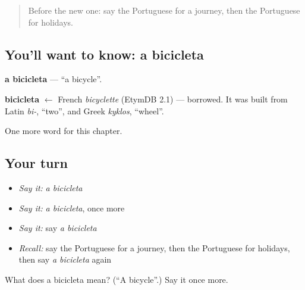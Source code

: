 \label{lesson:PT-C91-bicicleta}



\begin{quote}
Before the new one: say the Portuguese for a journey, then the Portuguese for holidays.
\end{quote}

\subsection*{You'll want to know: a bicicleta}
\textbf{a bicicleta} — \textquotedblleft{}a bicycle\textquotedblright{}.

\begin{cousinweb}
\textbf{bicicleta} $\leftarrow$ French \emph{bicyclette} (EtymDB 2.1) — borrowed. It was built from Latin \emph{bi-}, \textquotedblleft{}two\textquotedblright{}, and Greek \emph{kyklos}, \textquotedblleft{}wheel\textquotedblright{}.
\end{cousinweb}

\begin{grammarlens}[title={What you've built}]
One more word for this chapter.
\end{grammarlens}

\subsection*{Your turn}
\begin{itemize}
\raggedright
  \item \emph{Say it:} \emph{a bicicleta}
  \item \emph{Say it:} \emph{a bicicleta}, once more
  \item \emph{Say it:} say \emph{a bicicleta}
  \item \emph{Recall:} say the Portuguese for a journey, then the Portuguese for holidays, then say \emph{a bicicleta} again
\end{itemize}

\begin{tcolorbox}[breakable,colback=teal!4,colframe=teal!35!black,title={Before you move on}]
What does a bicicleta mean? (\textquotedblleft{}A bicycle\textquotedblright{}.) Say it once more.
\end{tcolorbox}
